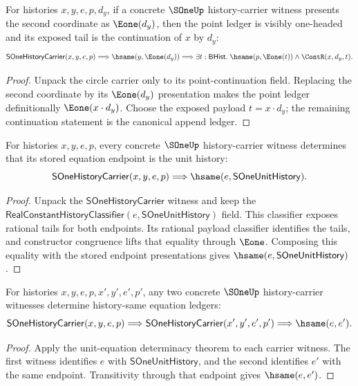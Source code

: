 \begin{theorem}
\label{thm:sone-history-carrier-y-e1-point-shape}
For histories $x,y,e,p,d_y$, if a concrete $\SOneUp$ history-carrier witness
presents the second coordinate as $\Eone(d_y)$, then the point ledger is
visibly one-headed and its exposed tail is the continuation of $x$ by $d_y$:
$$
\mathsf{SOneHistoryCarrier}(x,y,e,p)
\Longrightarrow
\hsame(y,\Eone(d_y))
\Longrightarrow
\exists t:\mathsf{BHist}.\;
\hsame(p,\Eone(t))\land \ContR(x,d_y,t).
$$
\end{theorem}
\begin{proof}
Unpack the circle carrier only to its point-continuation field. Replacing the
second coordinate by its $\Eone(d_y)$ presentation makes the point ledger
definitionally $\Eone(x\cdot d_y)$. Choose the exposed payload
$t=x\cdot d_y$; the remaining continuation statement is the canonical append
ledger.
\end{proof}

\begin{theorem}
\label{thm:s1-unit-equation-deterministic}
For histories $x,y,e,p$, every concrete $\SOneUp$ history-carrier witness
determines that its stored equation endpoint is the unit history:
$$
\mathsf{SOneHistoryCarrier}(x,y,e,p)
\Longrightarrow
\hsame(e,\mathsf{SOneUnitHistory}).
$$
\end{theorem}
\begin{proof}
Unpack the $\mathsf{SOneHistoryCarrier}$ witness and keep the
$\mathsf{RealConstantHistoryClassifier}(e,\mathsf{SOneUnitHistory})$ field.
This classifier exposes rational tails for both endpoints. Its rational payload
classifier identifies the tails, and constructor congruence lifts that equality
through $\Eone$. Composing this equality with the stored endpoint presentations
gives $\hsame(e,\mathsf{SOneUnitHistory})$.
\end{proof}

\begin{theorem}
\label{thm:sone-history-carrier-equation-pair-deterministic}
For histories $x,y,e,p,x',y',e',p'$, any two concrete $\SOneUp$ history-carrier
witnesses determine history-same equation ledgers:
$$
\mathsf{SOneHistoryCarrier}(x,y,e,p)
\Longrightarrow
\mathsf{SOneHistoryCarrier}(x',y',e',p')
\Longrightarrow
\hsame(e,e').
$$
\end{theorem}
\begin{proof}
Apply the unit-equation determinacy theorem to each carrier witness. The first
witness identifies $e$ with $\mathsf{SOneUnitHistory}$, and the second
identifies $e'$ with the same endpoint. Transitivity through that endpoint gives
$\hsame(e,e')$.
\end{proof}

